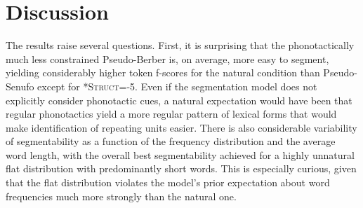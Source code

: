 \documentclass[11pt]{article}
\begin{document}
\section{Discussion}
\vspace*{-5pt}
The results raise several questions. First, it is surprising that the phonotactically much less constrained Pseudo-Berber is, on average, more easy to segment, yielding considerably higher token f-scores for the natural  condition than Pseudo-Senufo except for \textsc{*Struct}=-5. Even if the segmentation model does not explicitly consider phonotactic cues, a natural expectation would have been that regular phonotactics yield a more regular pattern of lexical forms that would make identification of repeating units easier. There is also considerable variability of segmentability as a function of the frequency distribution and the average word length, with the overall best segmentability achieved for a highly unnatural flat distribution with predominantly short words. This is especially curious, given that the flat distribution violates the model's prior expectation about word frequencies much more strongly than the natural one.
\end{document}
